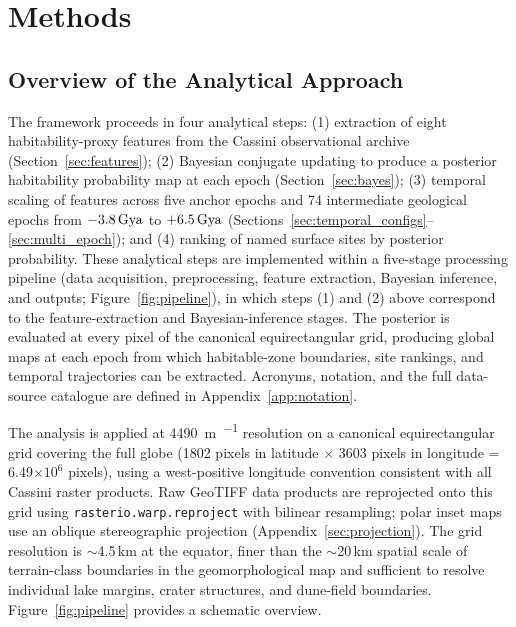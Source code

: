 \chapter{Methods}
\label{ch:methods}

\section{Overview of the Analytical Approach}
\label{sec:overview}

The framework proceeds in four analytical steps: (1) extraction of eight habitability-proxy features from the Cassini observational archive (Section~\ref{sec:features}); (2) Bayesian conjugate updating to produce a posterior habitability probability map at each epoch (Section~\ref{sec:bayes}); (3) temporal scaling of features across five anchor epochs and 74 intermediate geological epochs from $-3.8\,\text{Gya}$ to $+6.5\,\text{Gya}$ (Sections~\ref{sec:temporal_configs}--\ref{sec:multi_epoch}); and (4) ranking of named surface sites by posterior probability.  These analytical steps are implemented within a five-stage processing pipeline (data acquisition, preprocessing, feature extraction, Bayesian inference, and outputs; Figure~\ref{fig:pipeline}), in which steps (1) and (2) above correspond to the feature-extraction and Bayesian-inference stages.  The posterior is evaluated at every pixel of the canonical equirectangular grid, producing global maps at each epoch from which habitable-zone boundaries, site rankings, and temporal trajectories can be extracted.  Acronyms, notation, and the full data-source catalogue are defined in Appendix~\ref{app:notation}.

The analysis is applied at \SI{4490}{\metre\per{}} resolution on a
canonical equirectangular grid covering the full globe (1802 pixels in
latitude $\times$ 3603 pixels in longitude = 6.49$\times10^6$ pixels),
using a west-positive longitude convention consistent with all Cassini raster
products.  Raw GeoTIFF data products are reprojected onto this grid using \texttt{rasterio.warp.reproject} with bilinear resampling; polar inset maps use an oblique stereographic projection \citep{Snyder1987} (Appendix~\ref{sec:projection}).  The grid resolution is $\sim$4.5\,km at the equator,
finer than the $\sim$20\,km spatial scale of terrain-class boundaries in the \citet{Lopes2019}
geomorphological map and sufficient to resolve
individual lake margins, crater structures, and dune-field boundaries.
Figure~\ref{fig:pipeline} provides a schematic overview.

